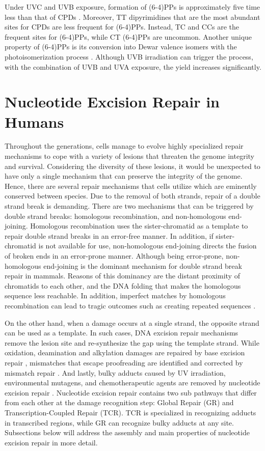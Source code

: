 Under UVC and UVB exposure, formation of (6-4)PPs is approximately five time less than that of CPDs \citep{douki2001individual}. Moreover, TT dipyrimidines that are the most abundant sites for CPDs are less frequent for (6-4)PPs. Instead, TC and CCs are the frequent sites for (6-4)PPs, while CT (6-4)PPs are uncommon. Another unique property of (6-4)PPs is its conversion into Dewar valence isomers with the photoisomerization process \citep{taylor1987dna}. Although UVB irradiation can trigger the process, with the combination of UVB and UVA exposure, the yield increases significantly.

\section{Nucleotide Excision Repair in Humans}

Throughout the generations, cells manage to evolve highly specialized repair mechanisms to cope with a variety of lesions that threaten the genome integrity and survival. Considering the diversity of these lesions, it would be unexpected to have only a single mechanism that can preserve the integrity of the genome. Hence, there are several repair mechanisms that cells utilize which are eminently conserved between species. Due to the removal of both strands, repair of a double strand break is demanding. There are two mechanisms that can be triggered by double strand breaks: homologous recombination, and non-homologous end-joining. Homologous recombination uses the sister-chromatid as a template to repair double strand breaks in an error-free manner. In addition, if sister-chromatid is not available for use, non-homologous end-joining directs the fusion of broken ends in an error-prone manner. Although being error-prone, non-homologous end-joining is the dominant mechanism for double strand break repair in mammals. Reasons of this dominancy are the distant proximity of chromatids to each other, and the DNA folding that makes the homologous sequence less reachable. In addition, imperfect matches by homologous recombination can lead to tragic outcomes such as creating repeated sequences \citep{li2018mismatch}.

On the other hand, when a damage occurs at a single strand, the opposite strand can be used as a template. In such cases, DNA excision repair mechanisms remove the lesion site and re-synthesize the gap using the template strand. While oxidation, deamination and alkylation damages are repaired by base excision repair \citep{klungland1999base}, mismatches that escape proofreading are identified and corrected by mismatch repair \citep{modrich1997strand}. And lastly, bulky adducts caused by UV irradiation, environmental mutagens, and chemotherapeutic agents are removed by nucleotide excision repair \citep{reardon2005nucleotide}. Nucleotide excision repair contains two sub pathways that differ from each other at the damage recognition step: Global Repair (GR) and Transcription-Coupled Repair (TCR). TCR is specialized in recognizing adducts in transcribed regions, while GR can recognize bulky adducts at any site. Subsections below will address the assembly and main properties of nucleotide excision repair in more detail.  

